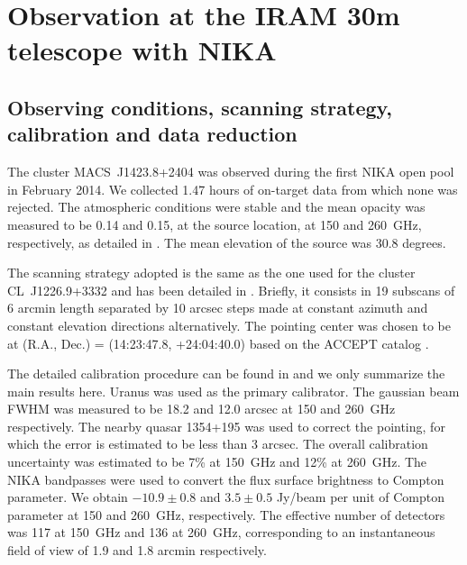 \documentclass[twocolumn,traditabstract]{aa}
\begin{document}
\section{Observation at the IRAM 30m telescope with NIKA}\label{sec:Observation_at_the_IRAM_30m_telescope_with_NIKA}
\subsection{Observing conditions, scanning strategy, calibration and data reduction}
The cluster \mbox{MACS~J1423.8+2404} was observed during the first NIKA open pool in February 2014. We collected 1.47 hours of on-target data from which none was rejected. The atmospheric conditions were stable and the mean opacity was measured to be 0.14 and 0.15, at the source location, at 150 and 260~GHz, respectively, as detailed in \cite{catalano2014}. The mean elevation of the source was 30.8 degrees.

The scanning strategy adopted is the same as the one used for the cluster \mbox{CL~J1226.9+3332} and has been detailed in \cite{adam2014}. Briefly, it consists in 19 subscans of 6 arcmin length separated by 10 arcsec steps made at constant azimuth and constant elevation directions alternatively. The pointing center was chosen to be at (R.A., Dec.) = (14:23:47.8, +24:04:40.0) based on the ACCEPT catalog \citep{cavagnolo2009}.

The detailed calibration procedure can be found in \cite{adam2014} and we only summarize the main results here. Uranus was used as the primary calibrator. The gaussian beam FWHM was measured to be 18.2 and 12.0 arcsec at 150 and 260~GHz respectively. The nearby quasar 1354+195 was used to correct the pointing, for which the error is estimated to be less than 3 arcsec. The overall calibration uncertainty was estimated to be 7\% at 150~GHz and 12\% at 260~GHz. The NIKA bandpasses were used to convert the flux surface brightness to Compton parameter. We obtain $-10.9 \pm 0.8$ and $3.5 \pm 0.5$ Jy/beam per unit of Compton parameter at 150 and 260~GHz, respectively. The effective number of detectors was 117 at 150~GHz and 136 at 260~GHz, corresponding to an instantaneous field of view of 1.9 and 1.8 arcmin respectively.
\end{document}
